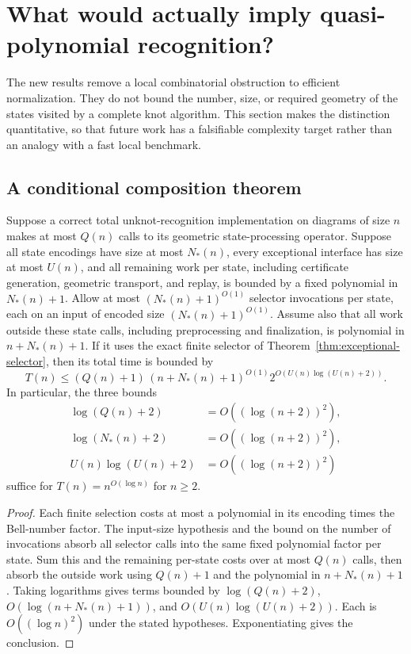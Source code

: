 \section{What would actually imply quasi-polynomial recognition?}
\label{sec:complexity}

The new results remove a local combinatorial obstruction to efficient
normalization.  They do not bound the number, size, or required geometry
of the states visited by a complete knot algorithm.  This section makes
the distinction quantitative, so that future work has a falsifiable
complexity target rather than an analogy with a fast local benchmark.

\subsection{A conditional composition theorem}

\begin{proposition}
\label{prop:composition}
Suppose a correct total unknot-recognition implementation on diagrams of
size $n$ makes at most $Q(n)$ calls to its geometric state-processing
operator.  Suppose all state encodings have size at most $N_*(n)$, every
exceptional interface has size at most $U(n)$, and all remaining work per
state, including certificate generation, geometric transport, and replay,
is bounded by a fixed polynomial in $N_*(n)+1$.  Allow at most
$(N_*(n)+1)^{O(1)}$ selector invocations per state, each on an input of
encoded size $(N_*(n)+1)^{O(1)}$.  Assume also that all work outside these
state calls, including preprocessing and finalization, is polynomial in
$n+N_*(n)+1$.  If it uses the exact finite selector of
Theorem~\ref{thm:exceptional-selector}, then its total time is bounded by
\begin{equation}
 T(n)\le (Q(n)+1)\,(n+N_*(n)+1)^{O(1)}
       2^{O(U(n)\log(U(n)+2))}.
 \label{eq:composition}
\end{equation}
In particular, the three bounds
\begin{align*}
 \log(Q(n)+2)&=O((\log(n+2))^2),\\
 \log(N_*(n)+2)&=O((\log(n+2))^2),\\
 U(n)\log(U(n)+2)&=O((\log(n+2))^2)
\end{align*}
suffice for $T(n)=n^{O(\log n)}$ for $n\ge2$.
\end{proposition}
\begin{proof}
Each finite selection costs at most a polynomial in its encoding times
the Bell-number factor.  The input-size hypothesis and the bound on the
number of invocations absorb all selector calls into the same fixed
polynomial factor per state.  Sum this and the remaining per-state costs
over at most $Q(n)$ calls, then absorb the outside work using $Q(n)+1$
and the polynomial in $n+N_*(n)+1$.  Taking logarithms gives terms bounded
by $\log(Q(n)+2)$, $O(\log(n+N_*(n)+1))$, and
$O(U(n)\log(U(n)+2))$.  Each is $O((\log n)^2)$ under the stated
hypotheses.  Exponentiating gives the conclusion.
\end{proof}

